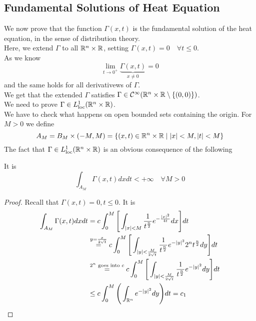 \subsection{Fundamental Solutions of Heat Equation}
We now prove that the function $\Gamma(x,t)$ is the fundamental solution of the heat equation, in the sense of distribution theory. \\
Here, we extend $\Gamma$ to all $\mathbb{R}^n \times \mathbb{R}$, setting $\Gamma(x,t) = 0 \quad \forall t \leq 0$.\\
As we know
\begin{equation*}
    \lim_{t \rightarrow 0^+} \underbrace{\Gamma(x,t)}_{x \neq 0} = 0
\end{equation*}
and the same holds for all derivativews of $\Gamma$. \\
We get that the extended $\Gamma$ satisfies $\Gamma \in \mathcal{C}^\infty(\mathbb{R}^n \times \mathbb{R} \setminus \{(0,0)\})$.\\
We need to prove $\Gamma \in L^1_{\text{loc}}(\mathbb{R}^n \times \mathbb{R})$.\\
We have to check what happens on open bounded sets containing the origin. For $M > 0$ we define 
\begin{equation*}
    A_M = B_M \times (-M,M) = \{(x,t) \in \mathbb{R}^n \times \mathbb{R} \mid |x| < M, |t| < M\}
\end{equation*}
The fact that $\Gamma \in L^1_{\text{loc}}(\mathbb{R}^n \times \mathbb{R})$ is an obvious consequence of the following 
\begin{PropBox}
    \begin{Lemma}
        It is 
        \begin{equation*}
            \int_{A_M} \Gamma(x,t) dx dt < +\infty \quad \forall M > 0
        \end{equation*}
    \end{Lemma}
\end{PropBox}
\begin{ProofBox}
    \begin{proof}
    Recall that $\Gamma(x,t) = 0, t \leq 0$. 
        It is 
        \begin{align*}
            \int_{A_M} \Gamma(x,t) dx dt  &= c \int_0^M \Bigg[\int_{|x| < M} \frac{1}{t^\frac{n}{2}}e^{-\frac{|x|^2}{4t}}dx\Bigg]dt \\
            &\stackrel{y = \frac{x}{2 \sqrt{t}}}= c \int_0^M \Bigg[\int_{|y| < \frac{M}{2 \sqrt{t}}} \frac{1}{t^\frac{n}{2}}e^{- |y|^2} 2^n t ^\frac{n}{2}dy\Bigg]dt \\
            &\stackrel{2^n\text{ goes into }c}= c \int_0^M \Bigg[\int_{|y| < \frac{M}{2 \sqrt{t}}} \frac{1}{t^\frac{n}{2}}e^{- |y|^2}dy\Bigg]dt \\
            &\leq c \int_0^M \Bigg(\int_{\mathbb{R}^n}e^{- |y|^2}dy\Bigg)dt = c_1 
        \end{align*}
    \end{proof}
\end{ProofBox}
